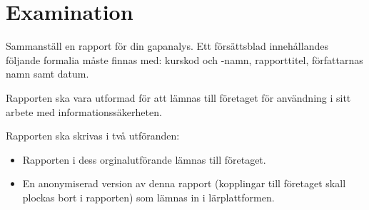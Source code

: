 \documentclass[a4paper]{article}
\begin{document}
\section{Examination}

Sammanställ en rapport för din gapanalys.
Ett försättsblad innehållandes följande formalia måste finnas med:
kurskod och -namn, rapporttitel, författarnas namn samt datum.

Rapporten ska vara utformad för att lämnas till företaget för användning i sitt
arbete med informationssäkerheten.

Rapporten ska skrivas i två utföranden:
\begin{itemize}
  \item Rapporten i dess orginalutförande lämnas till företaget.
  \item En anonymiserad version av denna rapport (kopplingar till företaget
    skall plockas bort i rapporten) som lämnas in i lärplattformen.
\end{itemize}



\printbibliography{}
\end{document}

